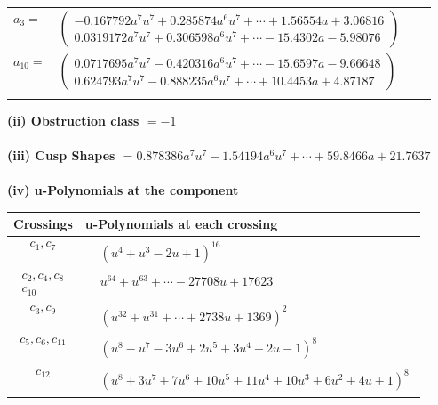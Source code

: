 \documentclass[1p]{elsarticle_modified}
\theoremstyle{definition}
\begin{document}
\begin{tabular}{m{7pt} m{180pt} m{7pt} m{180pt} }
\flushright $a_{3}=$&$\begin{pmatrix}-0.167792 a^{7} u^{7}+0.285874 a^{6} u^{7}+\cdots+1.56554 a+3.06816\\0.0319172 a^{7} u^{7}+0.306598 a^{6} u^{7}+\cdots-15.4302 a-5.98076\end{pmatrix}$ \\
\flushright $a_{10}=$&$\begin{pmatrix}0.0717695 a^{7} u^{7}-0.420316 a^{6} u^{7}+\cdots-15.6597 a-9.66648\\0.624793 a^{7} u^{7}-0.888235 a^{6} u^{7}+\cdots+10.4453 a+4.87187\end{pmatrix}$\\&\end{tabular}
\flushleft \textbf{(ii) Obstruction class $= -1$}\\~\\
\flushleft \textbf{(iii) Cusp Shapes $= 0.878386 a^{7} u^{7}-1.54194 a^{6} u^{7}+\cdots+59.8466 a+21.7637$}\\~\\
\newpage\renewcommand{\arraystretch}{1}
\flushleft \textbf{(iv) u-Polynomials at the component}\newline \\
\begin{tabular}{m{50pt}|m{274pt}}
Crossings & \hspace{64pt}u-Polynomials at each crossing \\
\hline $$\begin{aligned}c_{1},c_{7}\end{aligned}$$&$\begin{aligned}
&(u^4+u^3-2 u+1)^{16}
\end{aligned}$\\
\hline $$\begin{aligned}c_{2},c_{4},c_{8}\\c_{10}\end{aligned}$$&$\begin{aligned}
&u^{64}+u^{63}+\cdots-27708 u+17623
\end{aligned}$\\
\hline $$\begin{aligned}c_{3},c_{9}\end{aligned}$$&$\begin{aligned}
&(u^{32}+u^{31}+\cdots+2738 u+1369)^{2}
\end{aligned}$\\
\hline $$\begin{aligned}c_{5},c_{6},c_{11}\end{aligned}$$&$\begin{aligned}
&(u^8- u^7-3 u^6+2 u^5+3 u^4-2 u-1)^8
\end{aligned}$\\
\hline $$\begin{aligned}c_{12}\end{aligned}$$&$\begin{aligned}
&(u^8+3 u^7+7 u^6+10 u^5+11 u^4+10 u^3+6 u^2+4 u+1)^8
\end{aligned}$\\
\hline
\end{tabular}\\~\\
\end{document}

